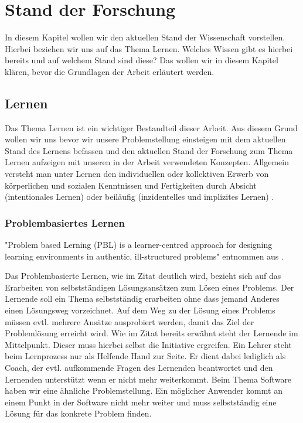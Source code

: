 
\chapter{Stand der Forschung}
In diesem Kapitel wollen wir den aktuellen Stand der Wissenschaft vorstellen. Hierbei beziehen wir uns auf das Thema Lernen. Welches Wissen gibt es hierbei bereits und auf welchem Stand sind diese? Das wollen wir in diesem Kapitel klären, bevor die Grundlagen der Arbeit erläutert werden.

\section{Lernen}
Das Thema Lernen ist ein wichtiger Bestandteil dieser Arbeit. Aus diesem Grund wollen wir uns bevor wir unsere Problemstellung einsteigen mit dem aktuellen Stand des Lernens befassen und den aktuellen Stand der Forschung zum Thema Lernen aufzeigen mit unseren in der Arbeit verwendeten Konzepten. Allgemein versteht man unter Lernen den individuellen oder kollektiven Erwerb von körperlichen und sozialen Kenntnissen und Fertigkeiten durch Absicht (intentionales Lernen) oder beiläufig (inzidentelles und implizites Lernen) \cite{lernen}.



\subsection{Problembasiertes Lernen}
"Problem based Lerning (PBL) is a learner-centred approach for designing learning environments in authentic, ill-structured problems" entnommen aus \cite{problembasiertes}. \par

Das Problembasierte Lernen, wie im Zitat deutlich wird, bezieht sich auf das Erarbeiten von selbstständigen Lösungsansätzen zum Lösen eines Problems. Der Lernende soll ein Thema selbstständig erarbeiten ohne dass jemand Anderes einen Lösungsweg vorzeichnet. Auf dem Weg zu der Lösung eines Problems müssen evtl. mehrere Ansätze ausprobiert werden, damit das Ziel der Problemlösung erreicht wird. Wie im Zitat bereits erwähnt steht der Lernende im Mittelpunkt. Dieser muss hierbei selbst die Initiative ergreifen. Ein Lehrer steht beim Lernprozess nur als Helfende Hand zur Seite. Er dient dabei lediglich als Coach, der evtl. aufkommende Fragen des Lernenden beantwortet und den Lernenden unterstützt wenn er nicht mehr weiterkommt. Beim Thema Software haben wir eine ähnliche Problemstellung. Ein möglicher Anwender kommt an einem Punkt in der Software nicht mehr weiter und muss selbstständig eine Lösung für das konkrete Problem finden. 
 
